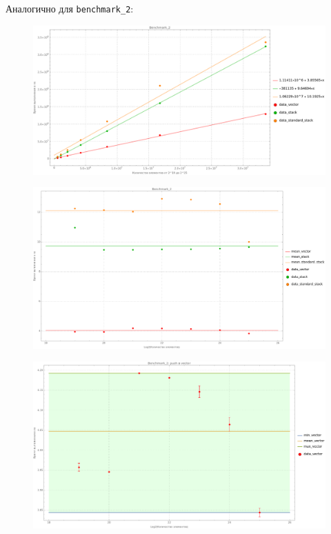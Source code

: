 Аналогично для \texttt{benchmark_2}:
\begin{figure}[H]
  \centering
  \includegraphics[width=1.0\textwidth]{../../resources/benchmark_2_1.png}
  \caption{}
\end{figure}
\begin{figure}[H]
  \centering
  \includegraphics[width=1.0\textwidth]{../../resources/benchmark_2_2.png}
  \caption{}
\end{figure}
\begin{figure}[H]
  \centering
  \includegraphics[width=1.0\textwidth]{../../resources/benchmark_2_3.png}
  \caption{}
\end{figure}
